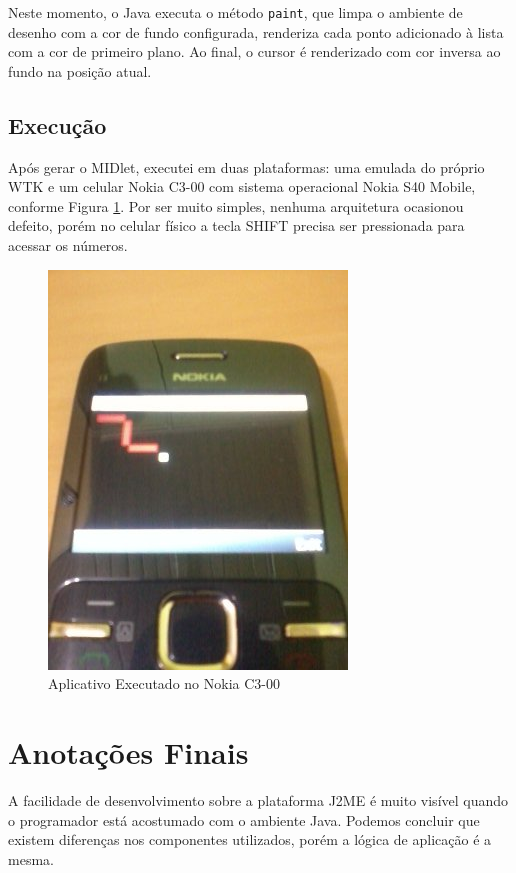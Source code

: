 \documentclass{article}
\begin{document}
Neste momento, o Java executa o método \texttt{paint}, que limpa o ambiente de
desenho com a cor de fundo configurada, renderiza cada ponto adicionado à lista
com a cor de primeiro plano. Ao final, o cursor é renderizado com cor inversa ao
fundo na posição atual.

\subsection{Execução}

Após gerar o MIDlet, executei em duas plataformas: uma emulada do próprio WTK e
um celular Nokia C3-00 com sistema operacional Nokia S40 Mobile, conforme
Figura \ref{fig:nokia}. Por ser muito simples, nenhuma arquitetura ocasionou
defeito, porém no celular físico a tecla SHIFT precisa ser pressionada para
acessar os números.

\begin{figure}
    \centering{}
    \includegraphics[scale=0.5]{screenshot02.jpg}
    \caption{Aplicativo Executado no Nokia C3-00}
    \label{fig:nokia}
\end{figure}

\section{Anotações Finais}
\label{sec:finais}

A facilidade de desenvolvimento sobre a plataforma J2ME é muito visível quando o
programador está acostumado com o ambiente Java. Podemos concluir que existem
diferenças nos componentes utilizados, porém a lógica de aplicação é a mesma.
\end{document}
